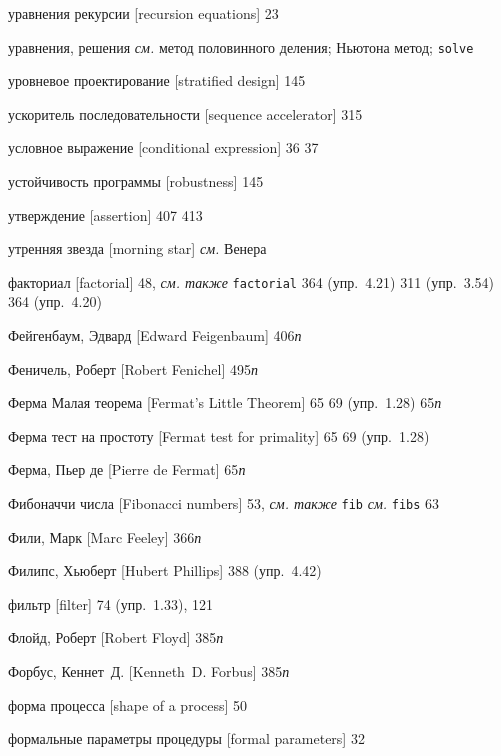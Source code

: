 \begin{theindex}
\item {уравнения рекурсии [recursion equations]} 23
\item {уравнения, решения} {\it см.} метод половинного деления; Ньютона метод; \texttt{solve}
\item {уровневое проектирование [stratified design]} 145
\item {ускоритель последовательности [sequence accelerator]} 315
\item {условное выражение [conditional expression]}
   36
   37
\item {устойчивость программы [robustness]} 145
\item {утверждение [assertion]} 407
   413
\item {утренняя звезда [morning star]} {\it см.} Венера
\bigskip
\item {факториал [factorial]} 48, {\it см. также} \texttt{factorial}
   364 (упр.~4.21)
   311 (упр.~3.54)
   364 (упр.~4.20)
\item {Фейгенбаум, Эдвард [Edward Feigenbaum]} 406{\it п}
\item {Феничель, Роберт [Robert Fenichel]} 495{\it п}
\item {Ферма Малая теорема [Fermat's Little Theorem]} 65
   69 (упр.~1.28)
   65{\it п}
\item {Ферма тест на простоту [Fermat test for primality]} 65
   69 (упр.~1.28)
\item {Ферма, Пьер де [Pierre de Fermat]} 65{\it п}
\item {Фибоначчи числа [Fibonacci numbers]} 53, {\it см. также} \texttt{fib}
   {\it см.} \texttt{fibs}
   63
\item {Фили, Марк [Marc Feeley]} 366{\it п}
\item {Филипс, Хьюберт [Hubert Phillips]} 388 (упр.~4.42)
\item {фильтр [filter]} 74 (упр.~1.33), 121
\item {Флойд, Роберт [Robert Floyd]} 385{\it п}
\item {Форбус, Кеннет~Д. [Kenneth~D. Forbus]} 385{\it п}
\item {форма процесса [shape of a process]} 50
\item {формальные параметры процедуры [formal parameters]} 32

\end{theindex}

